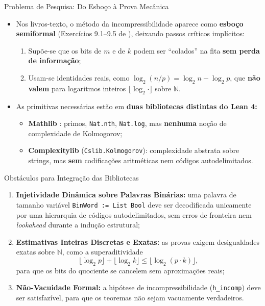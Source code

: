 \documentclass[10pt, aspectratio=43]{beamer}
\begin{document}
\begin{frame}{Problema de Pesquisa: Do Esboço à Prova Mecânica}
\small
\begin{itemize}
    \item Nos livros-texto, o método da incompressibilidade aparece como \textbf{esboço semiformal} (Exercícios 9.1--9.5 de ), deixando passos críticos implícitos:
    \begin{enumerate}
        \item Supõe-se que os bits de $m$ e de $k$ podem ser ``colados'' na fita \textbf{sem perda de informação};
        \item Usam-se identidades reais, como $\log_2(n/p) = \log_2 n - \log_2 p$, que \textbf{não valem} para logaritmos inteiros $\lfloor \log_2 \cdot \rfloor$ sobre $\mathbb{N}$.
    \end{enumerate}
    \medskip
    \item As primitivas necessárias estão em \textbf{duas bibliotecas distintas do Lean 4:}
    \begin{itemize}
        \item \textbf{Mathlib} \cite{mathlib2020}: primos, \texttt{Nat.nth}, \texttt{Nat.log}, mas \textbf{nenhuma} noção de complexidade de Kolmogorov;
        \item \textbf{Complexitylib} \cite{complexitylib2026} (\texttt{Cslib.Kolmogorov}): complexidade abstrata sobre strings, mas \textbf{sem} codificações aritméticas nem códigos autodelimitados.
    \end{itemize}
\end{itemize}
\end{frame}

\begin{frame}{Obstáculos para Integração das Bibliotecas}
\begin{enumerate}
    \item \textbf{Injetividade Dinâmica sobre Palavras Binárias:} uma palavra de tamanho variável \texttt{BinWord := List Bool} deve ser decodificada unicamente por uma hierarquia de códigos autodelimitados, sem erros de fronteira nem \textit{lookahead} durante a indução estrutural;
    \medskip
    \item \textbf{Estimativas Inteiras Discretas e Exatas:} as provas exigem desigualdades exatas sobre $\mathbb{N}$, como a superaditividade
    \begin{equation*}
        \lfloor\log_2 p\rfloor + \lfloor\log_2 k\rfloor \le \lfloor\log_2 (p\cdot k)\rfloor,
    \end{equation*}
    para que os bits do quociente se cancelem sem aproximações reais;
    \medskip
    \item \textbf{Não-Vacuidade Formal:} a hipótese de incompressibilidade (\texttt{h\_incomp}) deve ser satisfazível, para que os teoremas não sejam vacuamente verdadeiros.
\end{enumerate}
\end{frame}
\end{document}
